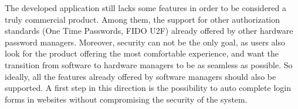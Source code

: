 \vspace{7pt}

The developed application still lacks some features in order to be considered a truly commercial product. Among them, the support for other authorization standards (One Time Passwords, FIDO U2F) already offered by other hardware password managers. Moreover, security can not be the only goal, as users also look for the product offering the most comfortable experience, and want the transition from software to hardware managers to be as seamless as possible. So ideally, all the features already offered by software managers should also be supported. A first step in this direction is the possibility to auto complete login forms in websites without compromising the security of the system.